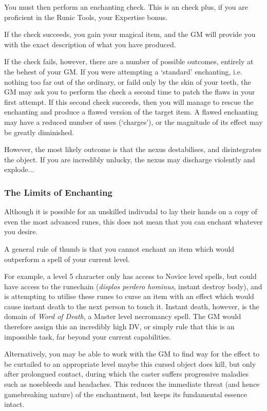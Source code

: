 You must then perform an enchanting check. This is an \attFin{} check plus, if you are proficient in the Runic Tools, your Expertise bonus. 

If the check succeeds, you gain your magical item, and the GM will provide you with the exact description of what you have produced. 

If the check fails, however, there are a number of possible outcomes, entirely at the behest of your GM. If you were attempting a `standard' enchanting, i.e. nothing too far out of the ordinary, or faild only by the skin of your teeth, the GM may ask you to perform the check a second time to patch the flaws in your first attempt. If this second check succeeds, then you will manage to rescue the enchanting and produce a flawed version of the target item. A flawed enchanting may have a reduced number of uses (`charges'), or the magnitude of its effect may be greatly diminished. 

However, the most likely outcome is that the nexus destabilises, and disintegrates the object. If you are incredibly unlucky, the nexus may discharge violently and explode...

\subsubsection{The Limits of Enchanting}

Although it is possible for an unskilled indivudal to lay their hands on a copy of even the most advanced runes, this does not mean that you can enchant whatever you desire. 

A general rule of thumb is that you cannot enchant an item which would outperform a spell of your current level. 

For example, a level 5 character only has access to Novice level spells, but could have access to the runechain \rune{\displos\perdero\hominus} ({\it displos perdero hominus}, instant destroy body), and is attempting to utilise these runes to curse an item with an effect which would cause instant death to the next person to touch it. Instant death, however, is the domain of {\it Word of Death}, a Master level necromancy spell. The GM would therefore assign this an incredibly high DV, or simply rule that this is an impossible task, far beyond your current capabilities. 

Alternatively, you may be able to work with the GM to find way for the effect to be curtailed to an appropriate level \minus{} maybe this cursed object does kill, but only after prolongued contact, during which the caster suffers progressive maladies such as nosebleeds and headaches. This reduces the immediate threat (and hence game\minus{}breaking nature) of the enchantment, but keeps its fundamental essence intact. 

